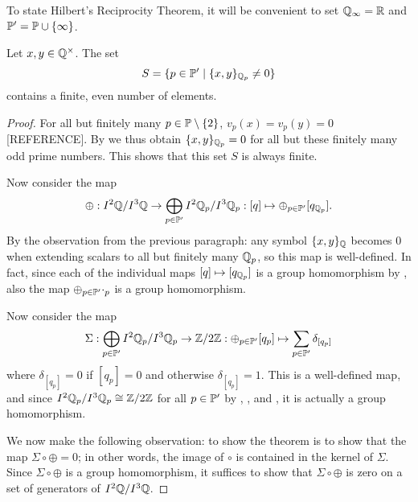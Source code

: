 \documentclass[12pt, leqno, british]{amsart}
\begin{document}
To state Hilbert's Reciprocity Theorem, it will be convenient to set $\mathbb Q_{\infty} = \mathbb R$ and $\mathbb P' = \mathbb P \cup \lbrace \infty \rbrace$.
\begin{thm}\label{T:HilbertReciprocity}
Let $x, y \in \mathbb Q^\times$.
The set
$$ S = \lbrace p \in \mathbb P' \mid \lbrace x, y \rbrace_{\mathbb Q_p} \neq 0 \rbrace$$
contains a finite, even number of elements.
\end{thm}
\begin{proof}
For all but finitely many $p \in \mathbb P \setminus \lbrace 2 \rbrace$, $v_p(x) = v_p(y) = 0$ [REFERENCE].
By  we thus obtain $\lbrace x, y \rbrace_{\mathbb Q_p} = 0$ for all but these finitely many odd prime numbers.
This shows that this set $S$ is always finite.

Now consider the map
\begin{displaymath}
\oplus : I^2\mathbb Q /I^3\mathbb Q \to \bigoplus_{p \in \mathbb P'} I^2\mathbb Q_p/I^3\mathbb Q_p : [q] \mapsto \oplus_{p \in \mathbb P'} [q_{\mathbb Q_p}].
\end{displaymath}
By the observation from the previous paragraph: any symbol $\lbrace x, y \rbrace_{\mathbb Q}$ becomes $0$ when extending scalars to all but finitely many $\mathbb Q_p$, so this map is well-defined.
In fact, since each of the individual maps $[q] \mapsto [q_{\mathbb Q_p}]$ is a group homomorphism by , also the map $\oplus_{p \in \mathbb P'}\cdot_p$ is a group homomorphism.

Now consider the map
\begin{displaymath}
\Sigma : \bigoplus_{p \in \mathbb P'} I^2\mathbb Q_p/I^3\mathbb Q_p \to \mathbb Z/2\mathbb Z : \oplus_{p \in \mathbb P'} [q_p] \mapsto \sum_{p \in \mathbb P'} \delta_{[q_p]}
\end{displaymath}
where $\delta_{[q_p]} = 0$ if $[q_p] = 0$ and otherwise $\delta_{[q_p]} = 1$.
This is a well-defined map, and since $I^2\mathbb Q_p/I^3\mathbb Q_p \cong \mathbb Z/2\mathbb Z$ for all $p \in \mathbb P'$ by , , and , it is actually a group homomorphism.

We now make the following observation: to show the theorem is to show that the map $\Sigma \circ \oplus = 0$; in other words, the image of $\circ$ is contained in the kernel of $\Sigma$.
Since $\Sigma \circ \oplus$ is a group homomorphism, it suffices to show that $\Sigma \circ \oplus$ is zero on a set of generators of $I^2\mathbb Q/I^3\mathbb Q$.


\end{proof}
\end{document}
